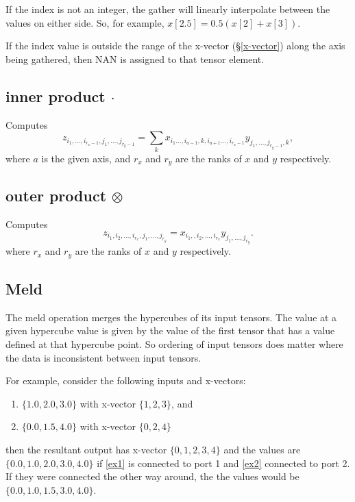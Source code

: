 If the index is not an integer, the gather will linearly interpolate
between the values on either side. So, for example,
$x[2.5] = 0.5 (x[2]+x[3])$.

If the index value is outside the range of the x-vector
(\S\ref{x-vector}) along the axis being gathered, then NAN is assigned
to that tensor element.

\subsection{inner product $\cdot$}\label{Operation:innerProduct}
Computes
\begin{displaymath}
  z_{i_1,\ldots,i_{r_x-1},j_1,\ldots,j_{r_y-1}} =
  \sum_k x_{i_1\ldots,i_{a-1},k,i_{a+1}\ldots,i_{r_x-1}}
  y_{j_1,\ldots,j_{r_y-1},k},
\end{displaymath}
where $a$ is the given axis, and $r_x$ and $r_y$ are the ranks of $x$
and $y$ respectively.

\subsection{outer product $\otimes$}\label{Operation:outerProduct}
Computes
\begin{displaymath}
  z_{i_1,i_2,\ldots,i_{r_x},j_1,\ldots,j_{r_y}} =
  x_{i_1,,i_2,\ldots,i_{r_x}}y_{j_1,\ldots,j_{r_y}}.
\end{displaymath}
where $r_x$ and $r_y$ are the ranks of $x$ and $y$ respectively.

\subsection{Meld}\label{Operation:meld}

The meld operation merges the hypercubes of its input tensors. The
value at a given hypercube value is given by the value of the first
tensor that has a value defined at that hypercube point. So ordering of
input tensors does matter where the data is inconsistent between input
tensors.

For example, consider the following inputs and x-vectors:

\begin{enumerate}
\item \label{ex1} $\{1.0, 2.0, 3.0\}$ with x-vector $\{1,2,3\}$, and
  \item \label {ex2} $\{0.0,1.5,4.0\}$ with x-vector $\{0,2,4\}$
  \end{enumerate}
then the resultant output has x-vector $\{0,1,2,3,4\}$ and the values
are $\{0.0,1.0,2.0,3.0,4.0\}$ if \ref{ex1} is connected to port 1 and
\ref{ex2} connected to port 2. If they were connected the other way
around, the the values would be $\{0.0,1.0,1.5,3.0,4.0\}$.


